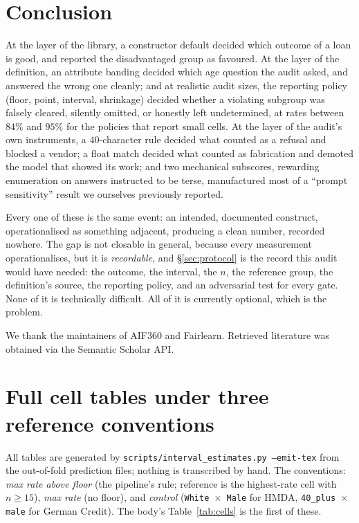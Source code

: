 \documentclass[sigconf,nonacm]{acmart}
\begin{document}
\section{Conclusion}

At the layer of the library, a constructor default decided which outcome of a
loan is good, and reported the disadvantaged group as favoured. At the layer
of the definition, an attribute banding decided which age question the audit
asked, and answered the wrong one cleanly; and at realistic audit sizes, the
reporting policy (floor, point, interval, shrinkage) decided whether a
violating subgroup was falsely cleared, silently omitted, or honestly left
undetermined, at rates between $84\%$ and $95\%$ for the policies that report
small cells. At the layer of the audit's own instruments, a 40-character rule
decided what counted as a refusal and blocked a vendor; a float match decided
what counted as fabrication and demoted the model that showed its work; and
two mechanical subscores, rewarding enumeration on answers instructed to be
terse, manufactured most of a ``prompt sensitivity'' result we ourselves
previously reported.

Every one of these is the same event: an intended, documented construct,
operationalised as something adjacent, producing a clean number, recorded
nowhere. The gap is not closable in general, because every measurement
operationalises, but it is \emph{recordable}, and \S\ref{sec:protocol} is
the record this audit would have needed: the outcome, the interval, the $n$,
the reference group, the definition's source, the reporting policy, and an
adversarial test for every gate. None of it is technically difficult. All of
it is currently optional, which is the problem.

\begin{acks}
We thank the maintainers of AIF360 and Fairlearn. Retrieved literature was
obtained via the Semantic Scholar API.
\end{acks}




\appendix

\section{Full cell tables under three reference conventions}
\label{app:cells}

All tables are generated by \texttt{scripts/interval\_estimates.py --emit-tex}
from the out-of-fold prediction files; nothing is transcribed by hand. The
conventions: \emph{max rate above floor} (the pipeline's rule; reference is
the highest-rate cell with $n \geq 15$), \emph{max rate} (no floor), and
\emph{control} (\texttt{White $\times$ Male} for HMDA, \texttt{40\_plus
$\times$ male} for German Credit). The body's Table~\ref{tab:cells} is the
first of these.
\end{document}
